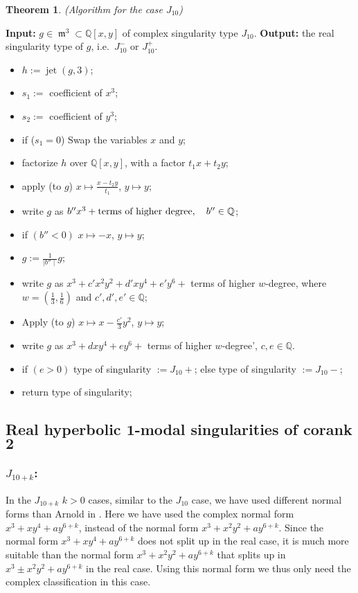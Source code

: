 \documentclass[noend]{amsproc}
\newtheorem{theorem}{Theorem}
\theoremstyle{definition}
\DeclareMathOperator{\m}{\mathfrak{m}}
\DeclareMathOperator{\jt}{jet}
\begin{document}
\begin{theorem}(Algorithm for the case $J_{10}$)
\end{theorem}
\noindent\textnormal{\bf Input:} $g\in \m^3\subset\mathbb Q[x,y]$ of complex
singularity type $J_{10}$.\newline
\textnormal{\bf Output:} the real singularity type of $g$, i.e.~$J_{10}^-$ or
$J_{10}^+$.
\begin{itemize}
\item $h:= \jt(g,3)$;
\item $s_1:=$ coefficient of $x^3$;
\item $s_2:=$ coefficient of $y^3$;
\item if ($s_1=0$)\newline
\phantom{}\quad\quad Swap the variables $x$ and $y$;
\item factorize $h$ over $\mathbb Q[x,y]$, with a factor $t_1x+t_2y$;
\item apply (to $g$) $x\mapsto\frac{x-t_2y}{t_1}$, $y\mapsto y$;
\item write $g$ as
$b''x^3+\textnormal{terms of higher degree},\quad b''\in\mathbb Q$;
\item if $(b'' <0)$\newline
\phantom{}\quad $x\mapsto -x$, $y\mapsto y$;
\item $g:= \frac{1}{\mid b''\mid} g$;
\item write $g$ as $x^3+c'x^2y^2+d'xy^4+e'y^6+$ terms of higher $w$-degree,
where $w=(\frac{1}{3},\frac{1}{6})$ and $c',d',e'\in\mathbb Q$;
\item Apply (to $g$) $x\mapsto x-\frac{c'}{3}y^2$, $y\mapsto y$;
\item write $g$ as $x^3+dxy^4+ey^6+$ terms of higher $w$-degree',\quad
$c,e\in\mathbb Q$.
\item if $(e>0)$\newline
\phantom{}\quad  type of singularity $:=J_{10}+$;\newline
\phantom{}else\newline
\phantom{}\quad type of singularity $:=J_{10}-$;
\item return type of singularity;
\end{itemize}

\subsection{Real hyperbolic $\mathbf 1$-modal singularities of corank $\mathbf 2$}
\subsubsection{$J_{10+k}$:}In the $J_{10+k}$ $k>0$ cases, similar to the $J_{10}$ case, we have used
different normal forms than Arnold in \cite{AVG1985}.
Here we have used the complex normal form $x^3+xy^4+a y^{6+k}$, instead of the
normal form $x^3+x^2y^2+ay^{6+k}$. Since the normal form $x^3+xy^4+a y^{6+k}$
does not split up in the real case, it is much more suitable than the normal
form $x^3+x^2y^2+ay^{6+k}$ that splits up in $x^3\pm x^2y^2+ay^{6+k}$ in the
real case. Using this normal form we thus only need the complex classification
in this case.
\end{document}
